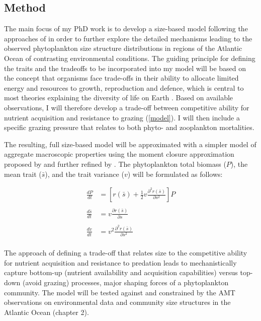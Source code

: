 \subsection{Method}
The main focus of my PhD work is to develop a size-based model following the approaches of  \citet{Bruggeman2007, Merico2009} in order to further explore the detailed mechanisms leading to the observed phytoplankton size structure distributions in regions of the Atlantic Ocean of contrasting environmental conditions. The guiding principle for defining the traits and the tradeoffs to be incorporated into my model will be based on the concept that organisms face trade-offs in their ability to allocate limited energy and resources to growth, reproduction and defence, which is central to most theories explaining the diversity of life on Earth \citep{Tilman2000}. Based on available observations, I will therefore develop a trade-off between competitive ability for nutrient acquisition and resistance to grazing (\ref{model}). I will then include a specific grazing pressure that relates to both phyto- and zooplankton mortalities.

The resulting, full size-based model will be approximated with a simpler model of aggregate macroscopic properties using the moment closure approximation proposed by \citet{Wirtz1996, Norberg2001} and further refined by \citet{Bruggeman2007, Merico2009}. The phytoplankton total biomass ($P$), the mean trait ($\bar{s}$), and the trait variance ($v$) will be formulated as follows:

\begin{align*}
\frac{dP}{dt} & = \left[r(\bar{s})+\frac{1}{2}v\frac{\partial^{2} r(\bar{s})}{\partial s^{2}}\right]P \nonumber \\
& \nonumber \\
\frac{d\bar{s}}{dt} & = v\frac{\partial r(\bar{s})}{\partial s}\nonumber \\
&\nonumber \\
\frac{dv}{dt} & = v^{2}\frac{\partial^{2} r(\bar{s})}{\partial s^{2}}\nonumber\\
\end{align*}

The approach of defining a trade-off that relates size to the competitive ability for nutrient acquisition and resistance to predation \citep{Merico2009} leads to mechanistically capture bottom-up (nutrient availability and acquisition capabilities) versus top-down (avoid grazing) processes, major shaping forces of a phytoplankton community. The model will be tested against and constrained by the AMT observations on environmental data and community size structures in the Atlantic Ocean (chapter 2).  

